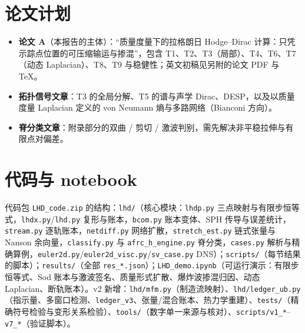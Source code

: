 \section{论文计划}
\begin{itemize}
\item \textbf{论文 A}（本报告的主体）：“质量度量下的拉格朗日 Hodge–Dirac 计算：只凭示踪点位置的可压缩输运与掺混”，包含 T1、T2、T3（局部）、T4、T6、T7（动态 Laplacian）、T8、T9 与稳健性；英文初稿见另附的论文 PDF 与 TeX。
\item \textbf{拓扑信号文章}：T3 的全局分解、T5 的谱与声学 Dirac、DESP，以及以质量度量 Laplacian 定义的 von Neumann 熵与多路网络（Bianconi 方向）。
\item \textbf{脊分类文章}：附录部分的双曲 / 剪切 / 激波判别，需先解决非平稳拉伸与有限点对偏差。
\end{itemize}

\section{代码与 notebook}
代码包 \texttt{LHD\_code.zip} 的结构：\texttt{lhd/}（核心模块：\texttt{lhdp.py} 三点映射与有限步恒等式，\texttt{lhdx.py}/\texttt{lhd.py} 复形与账本，\texttt{bcom.py} 账本变体、SPH 传导与误差统计，\texttt{stream.py} 逐轨账本，\texttt{netdiff.py} 网络扩散，\texttt{stretch\_est.py} 链式张量与 Nanson 余向量，\texttt{classify.py} 与 \texttt{afrc\_h\_engine.py} 脊分类，\texttt{cases.py} 解析与精确算例，\texttt{euler2d.py}/\texttt{euler2d\_visc.py}/\texttt{sv\_case.py} DNS）；\texttt{scripts/}（每节结果的脚本）；\texttt{results/}（全部 \texttt{res\_*.json}）；\texttt{LHD\_demo.ipynb}（可运行演示：有限步恒等式、Sod 账本与激波签名、质量形式扩散、爆炸波掺混归因、动态 Laplacian、断轨账本）。v2 新增：\texttt{lhd/mfm.py}（制造流映射）、\texttt{lhd/ledger\_ub.py}（指示量、多窗口检测、\texttt{ledger\_v3}、张量/混合账本、热力学重建）、\texttt{tests/}（精确符号检验与变形关系检验）、\texttt{tools/}（数字单一来源与核对）、\texttt{scripts/v1\_*}–\texttt{v7\_*}（验证脚本）。

